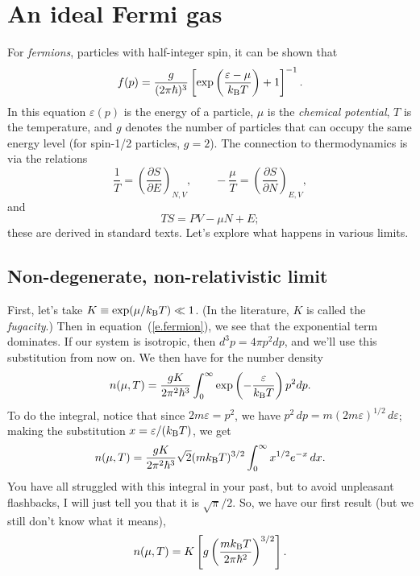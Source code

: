 \section{An ideal Fermi gas}

For \emph{fermions}, particles with half-integer spin, it can be shown that
\begin{equation}\label{e.fermion}
f(p) = \frac{g}{(2\pi\hbar)^{3}} \left[\exp\left(\frac{\varepsilon-\mu}{k_\mathrm{B} T}\right)+1\right]^{-1}.
\end{equation}
In this equation $\varepsilon(p)$ is the energy of a particle, $\mu$ is the \emph{chemical potential}, $T$ is the temperature, and $g$ denotes the number of particles that can occupy the same energy level (for spin-1/2 particles, $g=2$).  The connection to thermodynamics is via the relations
\[
\frac{1}{T} = \left(\frac{\partial S}{\partial E}\right)_{N,V},\qquad -\frac{\mu}{T} = \left(\frac{\partial S}{\partial N}\right)_{E,V},
\]
and 
\[
TS = PV - \mu N + E;
\]
these are derived in standard texts. Let's explore what happens in various limits.  

\subsection{Non-degenerate, non-relativistic limit}
First, let's take $K\equiv\exp(\mu/k_\mathrm{B} T)\ll 1$. (In the literature, $K$ is called the \emph{fugacity}.) Then in equation~(\ref{e.fermion}), we see that the exponential term dominates.  If our system is isotropic, then $d^{3}p = 4\pi p^{2}dp$, and we'll use this substitution from now on.  We then have for the number density
\begin{equation}
n(\mu,T) = \frac{gK}{2\pi^{2}\hbar^{3}}\int_{0}^{\infty}\exp\left(-\frac{\varepsilon}{k_\mathrm{B} T}\right) p^{2}dp.
\end{equation}
To do the integral, notice that since $2m\varepsilon = p^{2}$, we have $p^{2}\,dp = m(2m\varepsilon)^{1/2}\,d\varepsilon$; making the substitution $x = \varepsilon/(k_\mathrm{B} T)$, we get
\begin{equation}\label{e.n-int}
n(\mu,T) = \frac{gK}{2\pi^{2}\hbar^{3}}\sqrt{2}(mk_\mathrm{B} T)^{3/2}\int_{0}^{\infty} x^{1/2}e^{-x}\,dx.
\end{equation}
You have all struggled with this integral in your past, but to avoid unpleasant flashbacks, I will just tell you that it is $\sqrt{\pi}/2$.  So, we have our first result (but we still don't know what it means),
\begin{equation}\label{e.n-nondeg}
n(\mu,T) = K\left[g\left(\frac{mk_\mathrm{B} T}{2\pi\hbar^{2}}\right)^{3/2}\right].
\end{equation}

